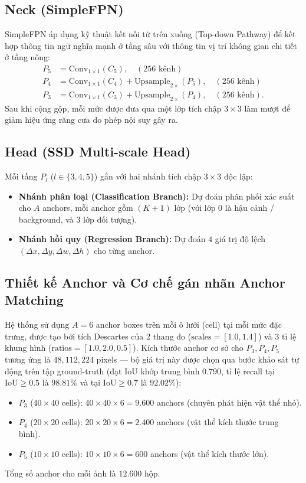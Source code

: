 \documentclass[fontsize=13pt,a4paper,oneside,DIV=calc,chapterprefix=true]{scrbook}
\begin{document}
\subsection{Neck (SimpleFPN)}
SimpleFPN áp dụng kỹ thuật kết nối từ trên xuống (Top-down Pathway) để kết hợp thông tin ngữ nghĩa mạnh ở tầng sâu với thông tin vị trí không gian chi tiết ở tầng nông:
\begin{align}
P_5 &= \mathrm{Conv}_{1\times 1}(C_5), \quad (256 \text{ kênh})\\
P_4 &= \mathrm{Conv}_{1\times 1}(C_4) + \mathrm{Upsample}_{2\times}(P_5), \quad (256 \text{ kênh})\\
P_3 &= \mathrm{Conv}_{1\times 1}(C_3) + \mathrm{Upsample}_{2\times}(P_4), \quad (256 \text{ kênh}).
\end{align}
Sau khi cộng gộp, mỗi mức được đưa qua một lớp tích chập $3 \times 3$ làm mượt để giảm hiệu ứng răng cưa do phép nội suy gây ra.

\subsection{Head (SSD Multi-scale Head)}
Mỗi tầng $P_l$ ($l \in \{3, 4, 5\}$) gắn với hai nhánh tích chập $3 \times 3$ độc lập:
\begin{itemize}[leftmargin=1.2cm]
    \item \textbf{Nhánh phân loại (Classification Branch):} Dự đoán phân phối xác suất cho $A$ anchors, mỗi anchor gồm $(K + 1)$ lớp (với lớp 0 là hậu cảnh / background, và 3 lớp đối tượng).
    \item \textbf{Nhánh hồi quy (Regression Branch):} Dự đoán $4$ giá trị độ lệch $(\Delta x, \Delta y, \Delta w, \Delta h)$ cho từng anchor.
\end{itemize}

\subsection{Thiết kế Anchor và Cơ chế gán nhãn Anchor Matching}
Hệ thống sử dụng $A = 6$ anchor boxes trên mỗi ô lưới (cell) tại mỗi mức đặc trưng, được tạo bởi tích Descartes của 2 thang đo ($\mathrm{scales} = [1.0, 1.4]$) và 3 tỉ lệ khung hình ($\mathrm{ratios} = [1.0, 2.0, 0.5]$). Kích thước anchor cơ sở cho $P_3, P_4, P_5$ tương ứng là $48, 112, 224$ pixels --- bộ giá trị này được chọn qua bước khảo sát tự động trên tập ground-truth (đạt IoU khớp trung bình $0.790$, tỉ lệ recall tại $\mathrm{IoU}\ge 0.5$ là $98.81\%$ và tại $\mathrm{IoU}\ge 0.7$ là $92.02\%$):
\begin{itemize}[leftmargin=1.2cm]
    \item $P_3$ ($40 \times 40$ cells): $40 \times 40 \times 6 = 9.600$ anchors (chuyên phát hiện vật thể nhỏ).
    \item $P_4$ ($20 \times 20$ cells): $20 \times 20 \times 6 = 2.400$ anchors (vật thể kích thước trung bình).
    \item $P_5$ ($10 \times 10$ cells): $10 \times 10 \times 6 = 600$ anchors (vật thể kích thước lớn).
\end{itemize}
Tổng số anchor cho mỗi ảnh là $12.600$ hộp.
\end{document}
